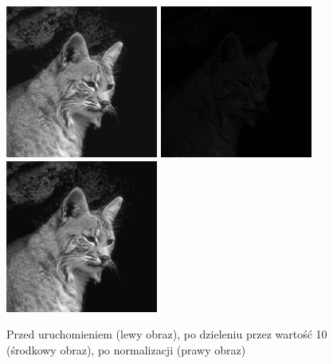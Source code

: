 \documentclass[a4paper,12pt]{book}
\begin{document}
\begin{figure}[H]
	\caption{Przed uruchomieniem (lewy obraz), po dzieleniu przez wartość 10 (środkowy obraz), po normalizacji (prawy obraz)}
	\includegraphics[width=5cm, height=5cm]{cat-unmodified.jpg}
	\includegraphics[width=5cm, height=5cm]{2-5/divide-gray-const-cat-10.png}
	\includegraphics[width=5cm, height=5cm]{2-5/divide-gray-const-cat-10-norm.png}
\end{figure}
\end{document}
